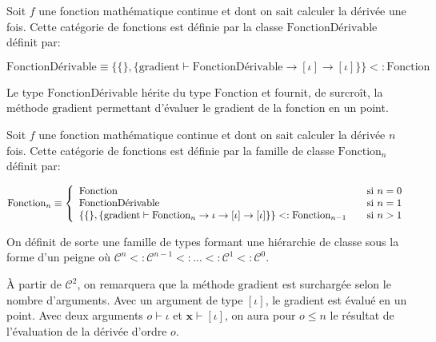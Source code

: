 \begin{mydef}\label{def:chap1_derivfcn}
  Soit $f$ une fonction mathématique continue et dont on sait calculer
  la dérivée une fois. Cette catégorie de fonctions est définie par la
  classe $\text{FonctionDérivable}$ définit par:

  \begin{equation}
    \text{FonctionDérivable} \equiv \{ \{ \}, \{ \text{gradient}
    \vdash \text{FonctionDérivable} \rightarrow [\iota] \rightarrow [\iota] \} \} <: \text{Fonction}
  \end{equation}

  Le type $\text{FonctionDérivable}$ hérite du type $\text{Fonction}$
  et fournit, de surcroît, la méthode $\text{gradient}$ permettant
  d'évaluer le gradient de la fonction en un point.
\end{mydef}

\begin{mydef}\label{def:chap1_nderivfcn}
  Soit $f$ une fonction mathématique continue et dont on sait calculer
  la dérivée $n$ fois. Cette catégorie de fonctions est définie par la
  famille de classe $\text{Fonction}_n$ définit par:

  \begin{equation}
  \begin{split}
    \text{Fonction}_n \equiv
    \left\{
    \begin{array}{l l}
      \text{Fonction} & \quad \text{si $n = 0$}\\
      \text{FonctionDérivable} & \quad \text{si $n = 1$}\\
      \{ \{ \}, \{ \text{gradient} \vdash \text{Fonction}_n \rightarrow \iota \rightarrow [\iota] \rightarrow [\iota] \} \} <: \text{Fonction}_{n-1} & \quad \text{si $n > 1$}\\
    \end{array} \right.
  \end{split}
  \end{equation}

  On définit de sorte une famille de types formant une hiérarchie de
  classe sous la forme d'un peigne où $\mathcal{C}^n <:
  \mathcal{C}^{n-1} <: \dotsc <: \mathcal{C}^1 <: \mathcal{C}^0$.

  À partir de $\mathcal{C}^2$, on remarquera que la méthode
  $\text{gradient}$ est surchargée selon le nombre d'arguments. Avec un
  argument de type $[\iota]$, le gradient est évalué en un point. Avec
  deux arguments $o \vdash \iota$ et $\mathbf{x} \vdash [\iota]$, on
  aura pour $o \leq n$ le résultat de l'évaluation de la dérivée d'ordre
  $o$.
\end{mydef}


